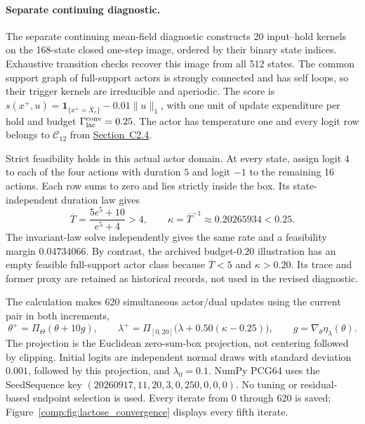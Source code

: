 \documentclass[11pt]{article}
\newcommand{\1}{\mathbf{1}}
\newcommand{\Tbar}{\overline{T}}
\newcommand{\proj}{\Pi}
\begin{document}
\paragraph{Separate continuing diagnostic.}
The separate continuing mean-field diagnostic constructs 20 input--hold kernels on the 168-state closed one-step image, ordered by their binary state indices. Exhaustive transition checks recover this image from all 512 states. The common support graph of full-support actors is strongly connected and has self loops, so their trigger kernels are irreducible and aperiodic. The score is $s(x^+,u)=\1_{\{x^+=\bar X_e\}}-0.01\|u\|_1$, with one unit of update expenditure per hold and budget $\Gamma_{\rm lac}^{\rm conv}=0.25$. The actor has temperature one and every logit row belongs to $\mathcal C_{12}$ from \hyperref[comp:sec:actor_geometry]{Section~C2.4}.

Strict feasibility holds in this actual actor domain. At every state, assign logit $4$ to each of the four actions with duration $5$ and logit $-1$ to the remaining 16 actions. Each row sums to zero and lies strictly inside the box. Its state-independent duration law gives
\[
 \Tbar=\frac{5e^5+10}{e^5+4}>4,
 \qquad \kappa=\Tbar^{-1}\approx0.20265934<0.25.
\]
The invariant-law solve independently gives the same rate and a feasibility margin $0.04734066$. By contrast, the archived budget-$0.20$ illustration has an empty feasible full-support actor class because $\Tbar<5$ and $\kappa>0.20$. Its trace and former proxy are retained as historical records, not used in the revised diagnostic.

The calculation makes 620 simultaneous actor/dual updates using the current pair in both increments,
\[
 \theta^+=\proj_\Theta(\theta+10g),\qquad
 \lambda^+=\proj_{[0,20]}\bigl(\lambda+0.50(\kappa-0.25)\bigr),
 \qquad g=\nabla_\theta\eta_\lambda(\theta).
\]
The projection is the Euclidean zero-sum-box projection, not centering followed by clipping. Initial logits are independent normal draws with standard deviation $0.001$, followed by this projection, and $\lambda_0=0.1$. NumPy PCG64 uses the SeedSequence key $(20260917,11,20,3,0,250,0,0,0)$. No tuning or residual-based endpoint selection is used. Every iterate from 0 through 620 is saved; Figure~\ref{comp:fig:lactose_convergence} displays every fifth iterate.
\end{document}
